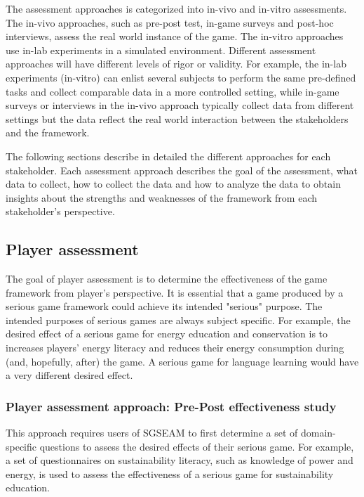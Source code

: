 \documentclass[11pt,oneside]{book}
\begin{document}
The assessment approaches is categorized into in-vivo and in-vitro assessments. The in-vivo approaches, such as pre-post test, in-game surveys and post-hoc interviews, assess the real world instance of the game. The in-vitro approaches use in-lab experiments in a simulated environment. Different assessment
approaches will have different levels of rigor or validity. For example, the in-lab experiments (in-vitro) can enlist several subjects to perform the same pre-defined tasks and collect comparable data in a more controlled setting, while in-game surveys or interviews in the in-vivo approach typically collect data from different settings but the data reflect the real world interaction between the stakeholders and the framework.

The following sections describe in detailed the different approaches for each stakeholder.  Each assessment approach describes the goal of the assessment, what data to collect, how to collect the data and how to analyze the data to obtain insights about the strengths and weaknesses of the framework from each stakeholder's perspective.

\subsection{Player assessment}

The goal of player assessment is to determine the effectiveness of the game
framework from player's perspective. It is essential that a game produced by a serious game
framework could achieve its intended "serious" purpose. The intended purposes of serious games are
always subject specific. For example, the desired effect of a serious game for
energy education and conservation is to increases players' energy literacy and
reduces their energy consumption during (and, hopefully, after) the game. A serious game for
language learning would have a very different desired effect.

\subsubsection{Player assessment approach: Pre-Post effectiveness study}
\label{Pre-Post effectiveness study}

This approach requires users of SGSEAM to first determine a set of domain-specific questions to assess the 
desired effects of their serious game. For example, a set of questionnaires on sustainability literacy, such as knowledge of power and energy, is used to assess the effectiveness of a serious game for sustainability education.
\end{document}
